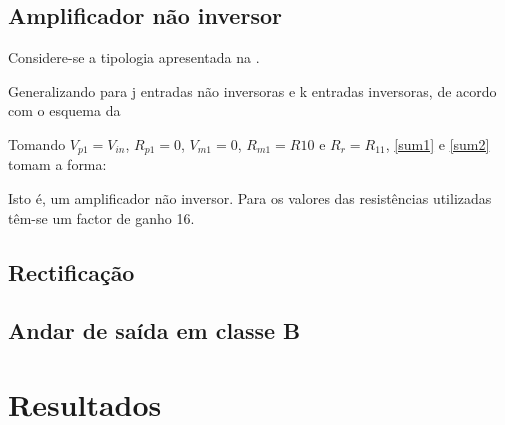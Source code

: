 \documentclass[%
  reprint,
  nofootinbib,
  amsmath,amssymb,
  aps,
  10pt,
  a4paper
]{revtex4-1}
\begin{document}
\subsection{Amplificador não inversor}

Considere-se a tipologia apresentada na .




Generalizando para j entradas não inversoras e k entradas inversoras, de acordo com o esquema da 

Tomando $V_{p1}=V_{in}$, $R_{p1}=0$, $V_{m1}=0$, $R_{m1}=R10$ e $R_r = R_{11}$, \eqref{sum1} e \eqref{sum2} tomam a forma:

Isto é, um amplificador não inversor. Para os valores das resistências utilizadas têm-se um factor de ganho 16.








\subsection{Rectificação}






\subsection{Andar de saída em classe B}



\section{Resultados}
\label{s:resul}
\end{document}
